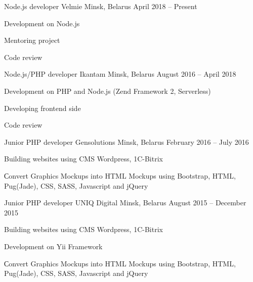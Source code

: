 

\begin{cventries}

  \cventry
    {Node.js developer} %
    {Velmie} %
    {Minsk, Belarus} %
    {April 2018 – Present} %
    {
      \begin{cvitems} %
		\item {Development on Node.js}
		\item {Mentoring project}
		\item {Code review}
      \end{cvitems}
    }

  \cventry
    {Node.js/PHP developer} %
    {Ikantam} %
    {Minsk, Belarus} %
    {August 2016 – April 2018} %
    {
      \begin{cvitems} %
		\item {Development on PHP and Node.js (Zend Framework 2, Serverless)}
		\item {Developing frontend side}
		\item {Code review}
      \end{cvitems}
    }

  \cventry
    {Junior PHP developer} %
    {Gensolutions} %
    {Minsk, Belarus} %
    {February 2016 – July 2016} %
    {
      \begin{cvitems} %
        \item {Building websites using CMS Wordpress, 1C-Bitrix}
		\item {Сonvert Graphics Mockups into HTML Mockups using Bootstrap, HTML, Pug(Jade), CSS, SASS, Javascript and jQuery}
      \end{cvitems}
    }

  \cventry
    {Junior PHP developer} %
    {UNIQ Digital} %
    {Minsk, Belarus} %
    {August 2015 – December 2015} %
    {
      \begin{cvitems} %
        \item {Building websites using CMS Wordpress, 1C-Bitrix}
		\item {Development on Yii Framework}
		\item {Сonvert Graphics Mockups into HTML Mockups using Bootstrap, HTML, Pug(Jade), CSS, SASS, Javascript and jQuery}
      \end{cvitems}
    }
	
\end{cventries}
